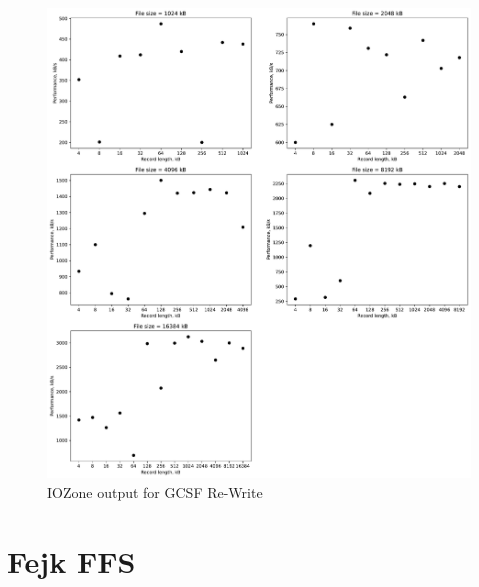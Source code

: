 \begin{figure}[!htb]
	\label{fig:app_benchgcsfs_re_write}
	\begin{center}
		\includegraphics[width=1.0\textwidth]{figures/benchmarking/gcsf/Re-Write.pdf}
	\end{center}
	\caption{IOZone output for GCSF Re-Write}
\end{figure}

\section{Fejk FFS}








